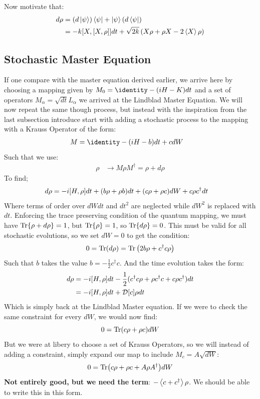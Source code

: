 Now motivate that:
\begin{align}
    d\rho &= (d\ket{\psi})\bra{\psi} + \ket{\psi}(d\bra{\psi}) \\
          &= -k \comm{X}{\comm{X}{\rho}}dt + \sqrt{2k} \left(X\rho + \rho X - 2 \expval{X}\rho \right) 
\end{align}

\subsection{Stochastic Master Equation}
If one compare with the master equation derived earlier, we arrive here by choosing a mapping given by $M_0 = \identity - (iH - K)dt$ and a set of operators $M_\alpha = \sqrt{dt}L_\alpha$ we arrived at the Lindblad Master Equation. We will now repeat the same though process, but instead with the inspiration from the last subsection introduce start with adding a stochastic process to the mapping with a Krauss Operator of the form:
\begin{align}
    M &= \identity - (iH - b)dt + c dW
\end{align}
Such that we use:
\begin{align}
    \rho &\to M\rho M^\dagger = \rho + d\rho
\end{align}
To find;
\begin{align}
    d\rho &= - i \comm{H}{\rho}dt  + (b\rho + \rho b) dt + (c\rho + \rho c)dW + c \rho c^\dagger dt
\end{align}
Where terms of order over $dWdt$ and $dt^2$ are neglected while $dW^2$ is replaced with $dt$. Enforcing the trace preserving condition of the quantum mapping, we must have $\Tr{\rho + d\rho} = 1$, but $\Tr{\rho} = 1$, so $\Tr{d\rho} = 0$. This must be valid for all stochastic evolutions, so we set $dW = 0$ to get the condition: 
\begin{align}
    0 = \Tr(d\rho) = \Tr\left(2 b\rho  + c^\dagger c \rho\right)
\end{align}
Such that $b$ takes the value $b = -\frac{1}{2} c^\dagger c$. And the time evolution takes the form:
\begin{align}
    d\rho &= -i \comm{H}{\rho}dt  -\frac12 (c^\dagger c\rho + \rho c^\dagger c + c \rho c^\dagger) dt \\
    &= -i\comm{H}{\rho}dt + \mathcal{D}[c]\rho dt
\end{align}
Which is simply back at the Lindblad Master equation. If we were to check the same constraint for every $dW$, we would now find:
\begin{equation}
    0 = \Tr(c\rho + \rho c) dW
\end{equation}
But we were at libery to choose a set of Krauss Operators, so we will instead of adding a constraint, simply expand our map to include $M_c = A \sqrt{dW}$:
\begin{equation}
    0 = \Tr(c\rho + \rho c + A \rho A^\dagger) dW
\end{equation}
\textbf{Not entirely good, but we need the term}: $-\expval{c + c^\dagger} \rho$. We should be able to write this in this form. 

